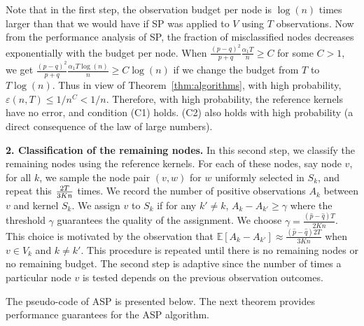 Note that in the first step, the observation budget per node is $\log (n)$ times larger than that we would have if SP was applied to $V$ using $T$ observations. Now from the performance analysis of SP, the fraction of misclassified nodes decreases exponentially with the budget per node. When $\frac{(p-q)^2 }{p+q }\frac{\alpha_1 T}{n} \ge C$ for some $C>1$, we get $\frac{(p-q)^2 }{p+q }\frac{\alpha_1 T \log(n)}{n} \ge C\log(n)$ if we change the budget from $T$ to $T\log(n)$. Thus in view of Theorem~\ref{thm:algorithms}, with high probability, $\varepsilon(n,T) \le 1/n^C < 1/ n$. Therefore, with high probability, the reference kernels have no error, and condition (C1) holds. (C2) also holds with high probability (a direct consequence of the law of large numbers).

{\bf 2. Classification of the remaining nodes.} In this second step, we classify the remaining nodes using the reference kernels. For each of these nodes, say node $v$, for all $k$, we sample the node pair $(v,w)$ for $w$ uniformly selected in $S_k$, and repeat this ${2T\over 3Kn}$ times. We record the number of positive observations $A_k$ between $v$ and kernel $S_k$. We assign $v$ to $S_k$ if for any $k'\neq k$, $A_k-A_{k'}\ge \gamma$ where the threshold $\gamma$ guarantees the quality of the assignment. We choose $\gamma=\frac{(\hat{p}-\hat{q})T}{2Kn}$. This choice is motivated by the observation that $\mathbb{E}[A_k - A_{k'}] \approx \frac{(\hat{p}-\hat{q})2T}{3Kn} $ when $v \in V_k$ and $k\neq k' $. This procedure is repeated until there is no remaining nodes or no remaining budget. The second step is adaptive since the number of times a particular node $v$ is tested depends on the previous observation outcomes.

The pseudo-code of ASP is presented below. The next theorem provides performance guarantees for the ASP algorithm.


